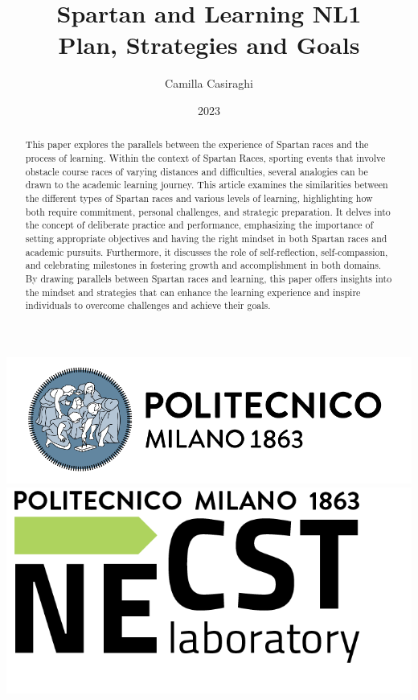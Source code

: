 \documentclass[12pt,oneside,a4paper]{article}
\title{\textbf{Spartan and Learning NL1 \\ Plan, Strategies and Goals}}
\author{Camilla Casiraghi}
\date{2023}
\begin{document}
\begin{titlepage}
	\centering
	\clearpage
	\maketitle
	\thispagestyle{empty}
	\vspace*{1cm}
	\vfill
	\centering
	\includegraphics{logo_polimi.png}\includegraphics{logo_NECST.png}
\end{titlepage}


\begin{abstract}
This paper explores the parallels between the experience of Spartan races and the process of learning. Within the context of Spartan Races, sporting events that involve obstacle course races of varying distances and difficulties, several analogies can be drawn to the academic learning journey. This article examines the similarities between the different types of Spartan races and various levels of learning, highlighting how both require commitment, personal challenges, and strategic preparation. It delves into the concept of deliberate practice and performance, emphasizing the importance of setting appropriate objectives and having the right mindset in both Spartan races and academic pursuits. Furthermore, it discusses the role of self-reflection, self-compassion, and celebrating milestones in fostering growth and accomplishment in both domains. By drawing parallels between Spartan races and learning, this paper offers insights into the mindset and strategies that can enhance the learning experience and inspire individuals to overcome challenges and achieve their goals.
\end{abstract}
\end{document}

